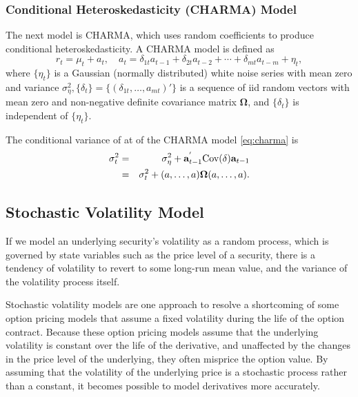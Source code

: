 \subsubsection{Conditional Heteroskedasticity (CHARMA) Model}
The next model is CHARMA, which uses random coefficients to produce conditional heteroskedasticity. A CHARMA model is defined as
\begin{equation}
r_t = \mu_t + a_t, \quad a_t=\delta_{1t} a_{t-1} + \delta_{2t} a_{t-2} +\cdots +\delta_{mt} a_{t-m} + \eta_t,
\label{eq:charma}
\end{equation}
where $\{\eta_t\}$ is a Gaussian (normally distributed) white noise series with mean zero and variance $\sigma^2_{\eta}, \{\delta_t\}=\{(\delta_{1t}, \ldots,a_{mt})'\}$ is a sequence of iid random vectors with mean zero and non-negative definite covariance matrix $\mathbf{\Omega}$, and $\{\delta_t\}$ is independent of $\{\eta_t\}$.

The conditional variance of at of the CHARMA model \eqref{eq:charma} is
\begin{eqnarray}
\sigma^2_t &=& \sigma^2_{\eta} + \textbf{a}^{'}_{t-1} \text{Cov}(\delta)\textbf{a}_{t-1} \notag \\ 
&=& \sigma^2_t + (a, \ldots, a)\mathbf{\Omega}(a, \ldots, a).
\end{eqnarray}

\subsection{Stochastic Volatility Model}
If we model an underlying security's volatility as a random process, which is governed by state variables such as the price level of a security, there is a tendency of volatility to revert to some long-run mean value, and the variance of the volatility process itself.

Stochastic volatility models are one approach to resolve a shortcoming of some option pricing models that assume a fixed volatility during the life of the option contract. Because these option pricing models assume that the underlying volatility is constant over the life of the derivative, and unaffected by the changes in the price level of the underlying, they often misprice the option value. By assuming that the volatility of the underlying price is a stochastic process rather than a constant, it becomes possible to model derivatives more 
accurately.

